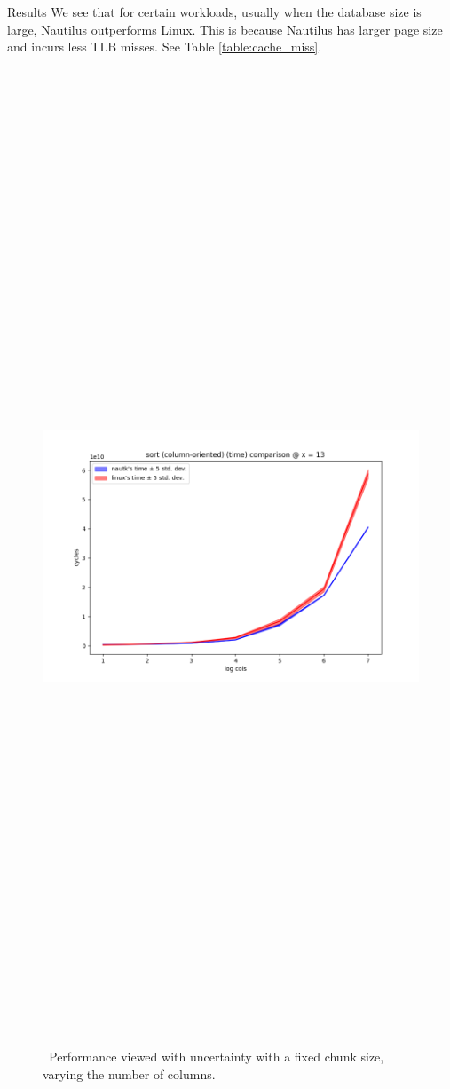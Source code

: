 \begin{block}{Results}
  We see that for certain workloads, usually when the database size is large, Nautilus outperforms Linux. This is because Nautilus has larger page size and incurs less TLB misses. See Table \ref{table:cache_miss}.

  \begin{figure}
    \includegraphics[height=30cm]{plots/sort.png}
    \caption{~Performance viewed with uncertainty with a fixed chunk size, varying the number of columns.}
    \label{fig:sort}
  \end{figure}


\end{block}
